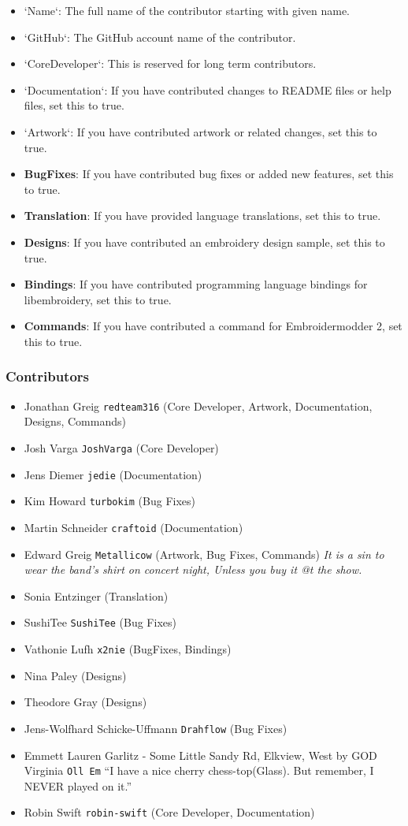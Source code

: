 \begin{itemize}
\item `Name`: The full name of the contributor starting with given name.
\item `GitHub`: The GitHub account name of the contributor.
\item `CoreDeveloper`: This is reserved for long term contributors.
\item `Documentation`: If you have contributed changes to README files or
help files, set this to true.
\item `Artwork`: If you have contributed artwork or related changes, set
this to true.
\item \textbf{BugFixes}: If you have contributed bug fixes or added new
features, set this to true.
\item \textbf{Translation}: If you have provided language translations, set this to true.
\item \textbf{Designs}: If you have contributed an embroidery design sample, set this to true.
\item \textbf{Bindings}: If you have contributed programming language
bindings for libembroidery, set this to true.
\item \textbf{Commands}: If you have contributed a command for Embroidermodder 2, set this to true.
\end{itemize}

\subsubsection{Contributors}

\begin{itemize}
\item Jonathan Greig \texttt{redteam316} (Core Developer, Artwork, Documentation, Designs, Commands)
\item Josh Varga \texttt{JoshVarga} (Core Developer)
\item Jens Diemer \texttt{jedie} (Documentation)
\item Kim Howard \texttt{turbokim} (Bug Fixes)
\item Martin Schneider \texttt{craftoid} (Documentation)
\item Edward Greig \texttt{Metallicow} (Artwork, Bug Fixes, Commands)
    \emph{It is a sin to wear the band's shirt on concert night, Unless you buy it @t the show.}
\item Sonia Entzinger (Translation)
\item SushiTee \texttt{SushiTee} (Bug Fixes)
\item Vathonie Lufh \texttt{x2nie} (BugFixes, Bindings)
\item Nina Paley (Designs)
\item Theodore Gray (Designs)
\item Jens-Wolfhard Schicke-Uffmann \texttt{Drahflow} (Bug Fixes)
\item Emmett Lauren Garlitz - Some Little Sandy Rd, Elkview, West by GOD Virginia \texttt{Oll Em}
    ``I have a nice cherry chess-top(Glass). But remember, I NEVER played on it.''
\item Robin Swift \texttt{robin-swift} (Core Developer, Documentation)
\end{itemize}

